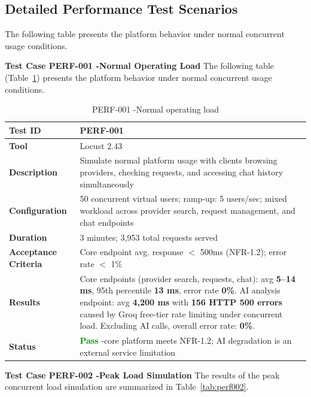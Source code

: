 \subsection{Detailed Performance Test Scenarios}
The following table presents the platform behavior under normal concurrent usage conditions.


\textbf{Test Case PERF-001 -Normal Operating Load}
The following table (Table~\ref{tab:perf001}) presents the platform behavior under normal concurrent usage conditions.

\begin{table}[H]
\caption{PERF-001 -Normal operating load}
\centering
\begin{tabular}{|l|p{10cm}|}
\hline
\textbf{Test ID} & PERF-001 \\
\hline
\textbf{Tool} & Locust 2.43 \\
\hline
\textbf{Description} & Simulate normal platform usage with clients browsing providers, checking requests, and accessing chat history simultaneously \\
\hline
\textbf{Configuration} & 50 concurrent virtual users; ramp-up: 5 users/sec; mixed workload across provider search, request management, and chat endpoints \\
\hline
\textbf{Duration} & 3 minutes; 3,953 total requests served \\
\hline
\textbf{Acceptance Criteria} & Core endpoint avg. response $<$ 500ms (NFR-1.2); error rate $<$ 1\% \\
\hline
\textbf{Results} & Core endpoints (provider search, requests, chat): avg \textbf{5--14 ms}, 95th percentile \textbf{13 ms}, error rate \textbf{0\%}. AI analysis endpoint: avg \textbf{4,200 ms} with \textbf{156 HTTP 500 errors} caused by Groq free-tier rate limiting under concurrent load. Excluding AI calls, overall error rate: \textbf{0\%}. \\
\hline
\textbf{Status} & \textcolor{green}{\textbf{Pass}} -core platform meets NFR-1.2; AI degradation is an external service limitation \\
\hline
\end{tabular}

\label{tab:perf001}
\end{table}

\textbf{Test Case PERF-002 -Peak Load Simulation}
The results of the peak concurrent load simulation are summarized in Table~\ref{tab:perf002}.

